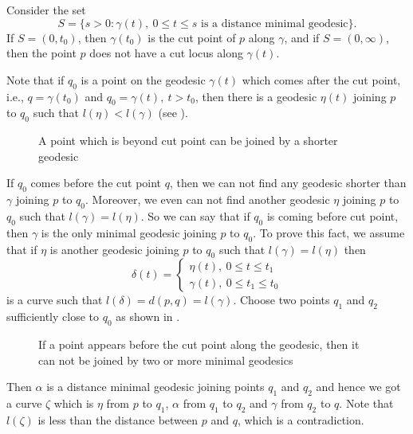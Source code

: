 \vspace{0.1cm}
\noindent Consider the set
\begin{displaymath}
    S=\{s>0:\gamma(t),~0\le t\le s \text{ is a distance minimal geodesic}\}.
\end{displaymath}
\noindent If $S=(0,t_0)$, then $\gamma(t_0)$ is the cut point of $p$ along $\gamma$, and if $S=(0,\infty)$, then the point $p$ does not have a cut locus along $\gamma(t)$. 

\vspace{0.1cm}
\noindent Note that if $q_0$ is a point on the geodesic $\gamma(t)$ which comes after the cut point, i.e., $q=\gamma(t_0)$ and $q_0=\gamma(t),~t>t_0$, then there  is a geodesic $\eta(t)$ joining $p$ to $q_0$ such that $l(\eta)<l(\gamma)$ (see ).
\begin{figure}[!htb]
    \centering
    \caption{A point which is beyond cut point can be joined by a shorter geodesic\label{fig:shorterGeodesicExists}}
\end{figure}

\vspace{0.3cm}
\noindent If $q_0$ comes before the cut point $q$, then we can not find any geodesic shorter than $\gamma$ joining $p$ to $q_0$. Moreover, we even can not find another geodesic $\eta$ joining $p$ to $q_0$ such that $l(\gamma)=l(\eta)$. So we can say that if $q_0$ is coming before cut point, then $\gamma$ is the only minimal geodesic joining $p$ to $q_0$. To prove this fact, we assume that if $\eta$ is another geodesic joining $p$ to $q_0$ such that $l(\gamma)=l(\eta)$ then 
\begin{displaymath}
    \delta(t)= 
    \begin{cases}
        \eta(t),~0\le t\le t_1 \\
        \gamma(t),~0\le t_1\le t_0
    \end{cases}
\end{displaymath}
is a curve such that $l(\delta)=d(p,q)=l(\gamma)$. Choose two points $q_1$ and $q_2$ sufficiently close to $q_0$ as shown in .
\begin{figure}[!htpb]
    \centering
    \caption{If a point appears before the cut point along the geodesic, then it can not be joined by two or more minimal geodesics\label{fig:shorterGeodesicDoesNotExists}}
\end{figure}
\noindent Then $\alpha$ is a distance minimal geodesic joining points $q_1$ and $q_2$ and hence we got a curve $\zeta$ which is $\eta$ from $p$ to $q_1$, $\alpha$ from $q_1$ to $q_2$ and $\gamma$ from $q_2$ to $q$. Note that $l(\zeta)$ is less than the distance between $p$ and $q$, which is a contradiction.

